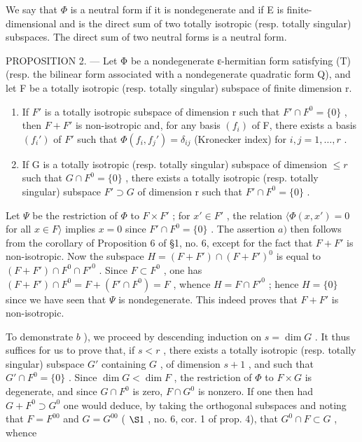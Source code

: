 We say that \(\Phi\) is a neutral form if it is nondegenerate and if E is finite-dimensional and is the direct sum of two totally isotropic (resp. totally singular) subspaces. The direct sum of two neutral forms is a neutral form.

PROPOSITION 2. --- Let Φ be a nondegenerate ε-hermitian form satisfying (T) (resp. the bilinear form associated with a nondegenerate quadratic form Q), and let F be a totally isotropic (resp. totally singular) subspace of finite dimension r.

\begin{enumerate}
\def\labelenumi{\alph{enumi})}
\item
  If \(F'\) is a totally isotropic subspace of dimension r such that \(F' \cap F^{0} = \{0\}\) , then \(F + F'\) is non-isotropic and, for any basis \((f_{i})\) of F, there exists a basis \((f_{i}')\) of \(F'\) such that \(\Phi(f_{i}, f_{j}') = \delta_{ij}\) (Kronecker index) for \(i, j = 1, \ldots, r\) .
\item
  If G is a totally isotropic (resp. totally singular) subspace of dimension \(\leqslant r\) such that \(G \cap F^{0} = \{0\}\) , there exists a totally isotropic (resp. totally singular) subspace \(F' \supset G\) of dimension r such that \(F' \cap F^{0} = \{0\}\) .
\end{enumerate}

Let \(\Psi\) be the restriction of \(\Phi\) to \(F \times F'\) ; for \(x' \in F'\) , the relation \(\langle \Phi(x, x') = 0\) for all \(x \in F\rangle\) implies \(x = 0\) since \(F' \cap F^0 = \{0\}\) . The assertion \(a)\) then follows from the corollary of Proposition 6 of §1, no. 6, except for the fact that \(F + F'\) is non-isotropic. Now the subspace \(H = (F + F') \cap (F + F')^0\) is equal to \((F + F') \cap F^0 \cap F'^0\) . Since \(F \subset F^0\) , one has \((F + F') \cap F^0 = F + (F' \cap F^0) = F\) , whence \(H = F \cap F'^0\) ; hence \(H = \{0\}\) since we have seen that \(\Psi\) is nondegenerate. This indeed proves that \(F + F'\) is non-isotropic.

To demonstrate \(b\) ), we proceed by descending induction on \(s = \dim G\) . It thus suffices for us to prove that, if \(s < r\) , there exists a totally isotropic (resp. totally singular) subspace \(G'\) containing \(G\) , of dimension \(s + 1\) , and such that \(G' \cap F^0 = \{0\}\) . Since \(\dim G < \dim F\) , the restriction of \(\Phi\) to \(F \times G\) is degenerate, and since \(G \cap F^0\) is zero, \(F \cap G^0\) is nonzero. If one then had \(G + F^0 \supset G^0\) one would deduce, by taking the orthogonal subspaces and noting that \(F = F^{00}\) and \(G = G^{00}\) ( \(\S 1\) , no. 6, cor. 1 of prop. 4), that \(G^0 \cap F \subset G\) , whence


